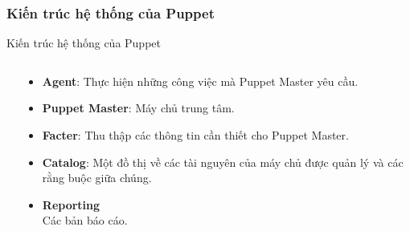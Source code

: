 \documentclass[14pt]{beamer}
\begin{document}
\subsubsection*{Kiến trúc hệ thống của Puppet}
\begin{frame}{Kiến trúc hệ thống của Puppet}
\setlength{\topsep}{0pt}
\begin{columns}
\begin{column}{0.75\textwidth}
    \begin{center}
    \end{center}
\end{column}
\hfill
\begin{column}{0.38\textwidth}
\begin{scriptsize}
  \begin{itemize}
  \item \textbf{Agent}: Thực hiện những công việc mà Puppet Master yêu cầu.
  \item \textbf{Puppet Master}: Máy chủ trung tâm.
  \pause
  \item \textbf{Facter}: Thu thập các thông tin cần thiết cho Puppet Master.
  \pause
  \item \textbf{Catalog}: Một đồ thị về các tài nguyên của máy chủ được quản lý và các rằng buộc giữa chúng.
  \pause
  \item \textbf{Reporting} \\ Các bản báo cáo.
  \end{itemize}
\end{scriptsize}
\end{column}
\end{columns}
\end{frame}
\end{document}
